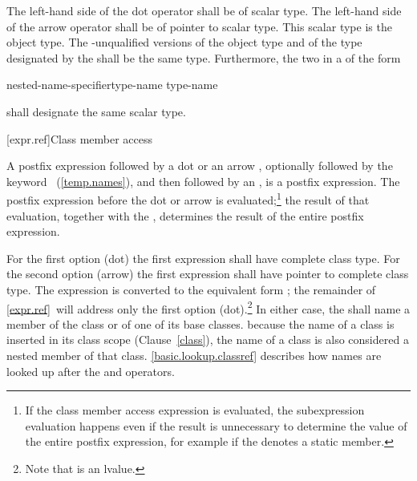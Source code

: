 \pnum
The left-hand side of the dot operator shall be of scalar type. The
left-hand side of the arrow operator shall be of pointer to scalar type.
This scalar type is the object type. The -unqualified
versions of the object type and of the type designated by the
 shall be the same type. Furthermore,
the two  in a  of
the form

\begin{ncbnf}
nested-name-specifier\opt type-name \terminal{::\,\tilde} type-name
\end{ncbnf}

shall designate the same scalar type.

[expr.ref]{Class member access}

\pnum
{}%
%
%
%
%
%
%
%
%
%
A postfix expression followed by a dot  or an arrow \tcode{->},
optionally followed by the keyword
~(\ref{temp.names}), and then followed by an
, is a postfix expression. The postfix
expression before the dot or arrow is evaluated;\footnote{If the class member
access expression is evaluated, the subexpression evaluation happens even if the
result is unnecessary to determine
the value of the entire postfix expression, for example if the
 denotes a static member.}
the result of that evaluation, together with the
, determines the result of the entire postfix
expression.

\pnum
{}%
For the first option (dot) the first expression
shall have complete class type.
For the second option (arrow) the first expression
shall have pointer to complete class type. The expression  is
converted to the equivalent form ; the remainder of
\ref{expr.ref}~will address only the first option (dot).\footnote{Note that
 is an lvalue.}
In either case, the
 shall name a member of the class or of one of
its base classes.
\enternote 
because the name of a class is inserted in its class scope
(Clause~\ref{class}), the name of a class is also considered a nested
member of that class.
\exitnote 
\enternote
\ref{basic.lookup.classref} describes how names are looked up after the
 and \tcode{->} operators.
\exitnote 

